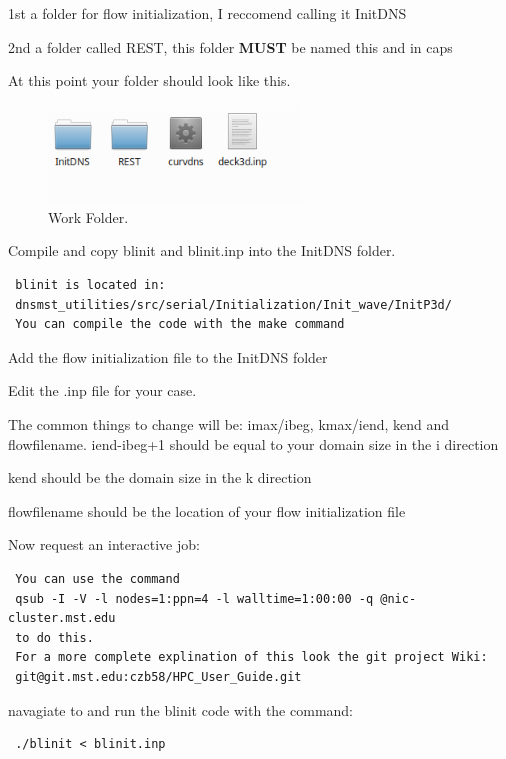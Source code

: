 \documentclass[12pt, oneside]{article}
\begin{document}
\indent 1st a folder for flow initialization, I reccomend calling it InitDNS
        
\indent 2nd a folder called REST, this folder \textbf{MUST} be named this and in caps


\noindent At this point your folder should look like this.

\begin{figure}[H]
  \begin{center}
  \includegraphics[width=0.6\textwidth]{FIGS/Folder_setup.png}
  \caption{Work Folder.}
  \label{fig:BCGrid}
  \end{center}
\end{figure}


\noindent Compile and copy blinit and blinit.inp into the InitDNS folder. 
\begin{verbatim}
 blinit is located in: 
 dnsmst_utilities/src/serial/Initialization/Init_wave/InitP3d/
 You can compile the code with the make command
\end{verbatim}
\noindent Add the flow initialization file to the InitDNS folder

\noindent Edit the .inp file for your case. 

\noindent The common things to change will be: imax/ibeg, kmax/iend, kend and flowfilename.
\indent iend-ibeg+1 should be equal to your domain size in the i direction

\indent kend should be the domain size in the k direction

\indent flowfilename should be the location of your flow initialization file

\noindent Now request an interactive job:
\begin{verbatim}
 You can use the command 
 qsub -I -V -l nodes=1:ppn=4 -l walltime=1:00:00 -q @nic-cluster.mst.edu 
 to do this.
 For a more complete explination of this look the git project Wiki:
 git@git.mst.edu:czb58/HPC_User_Guide.git
\end{verbatim}

\noindent navagiate to and run the blinit code with the command:
\begin{verbatim}
 ./blinit < blinit.inp
\end{verbatim}
\end{document}
